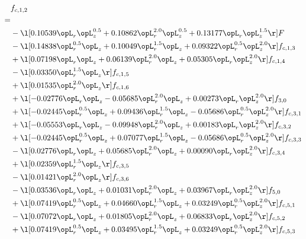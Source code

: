 \begin{alignat}{2} 
\label{eq:f_12_2} 
& f_{c,1,2} \nonumber \\ 
 = \\ 
& - \l[  0.10539 \opL_r \opL_z^{0.5} +  0.10862 \opL_r^{2.0} \opL_z^{0.5} +  0.13177 \opL_r \opL_z^{1.5}  \r] F \nonumber \\ 
& - \l[  0.14838 \opL_r^{0.5} \opL_z +  0.10049 \opL_r^{1.5} \opL_z +  0.09322 \opL_r^{0.5} \opL_z^{2.0}  \r] f_{c,1,3} \nonumber \\ 
& + \l[  0.07198 \opL_r \opL_z +  0.06139 \opL_r^{2.0} \opL_z +  0.05305 \opL_r \opL_z^{2.0}  \r] f_{c,1,4} \nonumber \\ 
& - \l[  0.03350 \opL_r^{1.5} \opL_z  \r] f_{c,1,5} \nonumber \\ 
& + \l[  0.01535 \opL_r^{2.0} \opL_z  \r] f_{c,1,6} \nonumber \\ 
& + \l[  -0.02776 \opL_r \opL_z   -0.05685 \opL_r^{2.0} \opL_z +  0.00273 \opL_r \opL_z^{2.0}  \r] f_{3,0} \nonumber \\ 
& + \l[  -0.02445 \opL_r^{0.5} \opL_z +  0.09436 \opL_r^{1.5} \opL_z   -0.05686 \opL_r^{0.5} \opL_z^{2.0}  \r] f_{c,3,1} \nonumber \\ 
& + \l[  -0.05553 \opL_r \opL_z   -0.09948 \opL_r^{2.0} \opL_z +  0.00183 \opL_r \opL_z^{2.0}  \r] f_{c,3,2} \nonumber \\ 
& + \l[  -0.02445 \opL_r^{0.5} \opL_z +  0.07077 \opL_r^{1.5} \opL_z   -0.05686 \opL_r^{0.5} \opL_z^{2.0}  \r] f_{c,3,3} \nonumber \\ 
& - \l[  0.02776 \opL_r \opL_z +  0.05685 \opL_r^{2.0} \opL_z +  0.00090 \opL_r \opL_z^{2.0}  \r] f_{c,3,4} \nonumber \\ 
& + \l[  0.02359 \opL_r^{1.5} \opL_z  \r] f_{c,3,5} \nonumber \\ 
& - \l[  0.01421 \opL_r^{2.0} \opL_z  \r] f_{c,3,6} \nonumber \\ 
& - \l[  0.03536 \opL_r \opL_z +  0.01031 \opL_r^{2.0} \opL_z +  0.03967 \opL_r \opL_z^{2.0}  \r] f_{5,0} \nonumber \\ 
& + \l[  0.07419 \opL_r^{0.5} \opL_z +  0.04660 \opL_r^{1.5} \opL_z +  0.03249 \opL_r^{0.5} \opL_z^{2.0}  \r] f_{c,5,1} \nonumber \\ 
& - \l[  0.07072 \opL_r \opL_z +  0.01805 \opL_r^{2.0} \opL_z +  0.06833 \opL_r \opL_z^{2.0}  \r] f_{c,5,2} \nonumber \\ 
& + \l[  0.07419 \opL_r^{0.5} \opL_z +  0.03495 \opL_r^{1.5} \opL_z +  0.03249 \opL_r^{0.5} \opL_z^{2.0}  \r] f_{c,5,3} \nonumber \\ 

\end{alignat}
